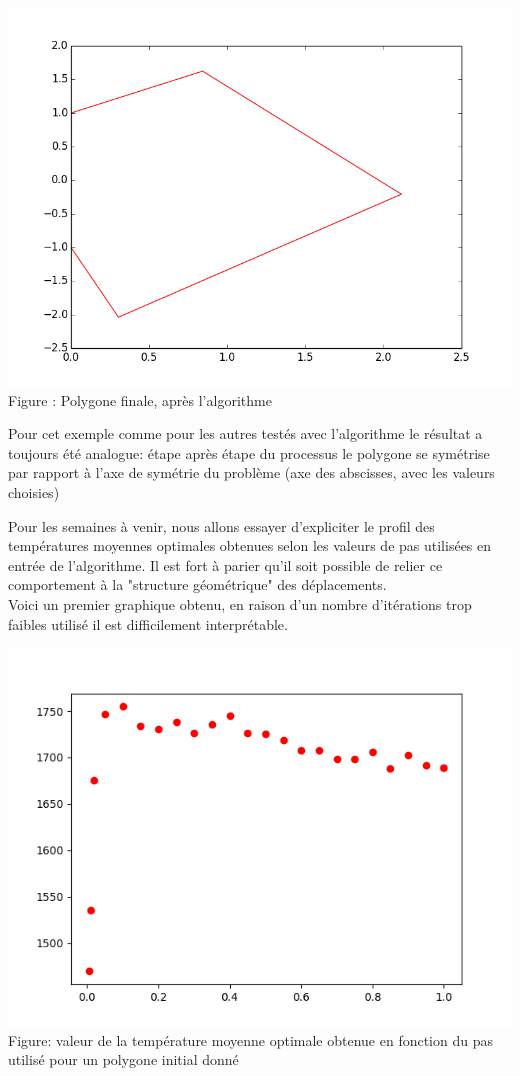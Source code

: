 \documentclass[a4paper,reqno]{article}
\begin{document}
\begin{center}
	\includegraphics[scale=0.5]{finale.png}
	\\ Figure : Polygone finale, après l'algorithme 
\end{center}

Pour cet exemple comme pour les autres testés avec l'algorithme le résultat a toujours été analogue: étape après étape du processus le polygone se symétrise par rapport à l'axe de symétrie du problème (axe des abscisses, avec les valeurs choisies)

Pour les semaines à venir, nous allons essayer d'expliciter le profil des températures moyennes optimales obtenues selon les valeurs de pas utilisées en entrée de l'algorithme. Il est fort à parier qu'il soit possible de relier ce comportement à la "structure géométrique" des déplacements.
\\ Voici un premier graphique obtenu, en raison d'un nombre d'itérations trop faibles utilisé il est difficilement interprétable.
\begin{center}
	\includegraphics[scale=0.5]{plotPas.png}
	\\ Figure: valeur de la température moyenne optimale obtenue en fonction du pas utilisé pour un polygone initial donné
\end{center}
\end{document}

